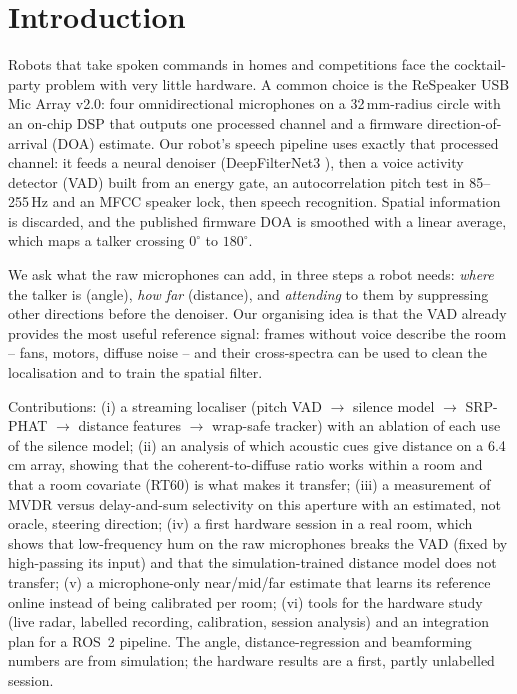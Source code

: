 \section{Introduction}

Robots that take spoken commands in homes and competitions face the
cocktail-party problem with very little hardware. A common choice is the
ReSpeaker USB Mic Array v2.0: four omnidirectional microphones on a
32\,mm-radius circle with an on-chip DSP that outputs one processed channel
and a firmware direction-of-arrival (DOA) estimate. Our robot's speech
pipeline uses exactly that processed channel: it feeds a neural denoiser
(DeepFilterNet3 \cite{schroeter2023deepfilternet3}), then a voice activity
detector (VAD) built from an energy gate, an autocorrelation pitch test in
85--255\,Hz and an MFCC speaker lock, then speech recognition. Spatial
information is discarded, and the published firmware DOA is smoothed with
a linear average, which maps a talker crossing $0^\circ$ to $180^\circ$.

We ask what the raw microphones can add, in three steps a robot needs:
\emph{where} the talker is (angle), \emph{how far} (distance), and
\emph{attending} to them by suppressing other directions before the
denoiser. Our organising idea is that the VAD already provides the most
useful reference signal: frames without voice describe the room -- fans,
motors, diffuse noise -- and their cross-spectra can be used to clean the
localisation and to train the spatial filter.

Contributions: (i) a streaming localiser (pitch VAD $\to$ silence model
$\to$ SRP-PHAT $\to$ distance features $\to$ wrap-safe tracker) with an
ablation of each use of the silence model; (ii) an analysis of which
acoustic cues give distance on a 6.4\,cm array, showing that the
coherent-to-diffuse ratio works within a room and that a room covariate
(RT60) is what makes it transfer; (iii) a measurement of MVDR versus
delay-and-sum selectivity on this aperture with an estimated, not oracle,
steering direction; (iv) a first hardware session in a real room, which
shows that low-frequency hum on the raw microphones breaks the VAD (fixed
by high-passing its input) and that the simulation-trained distance model
does not transfer; (v) a microphone-only near/mid/far estimate that learns
its reference online instead of being calibrated per room; (vi) tools for
the hardware study (live radar, labelled recording, calibration, session
analysis) and an integration plan for a ROS~2 pipeline. The angle,
distance-regression and beamforming numbers are from simulation; the
hardware results are a first, partly unlabelled session.
